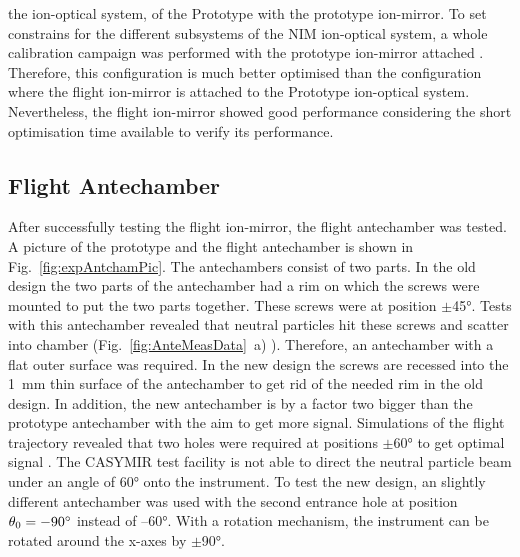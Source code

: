 	the ion-optical system, of the Prototype with the prototype ion-mirror. To set constrains for the different subsystems of the NIM ion-optical system, a whole calibration campaign was performed with the prototype ion-mirror attached \cite{Diss_Meyer}. Therefore, this configuration is much better optimised than the configuration where the flight ion-mirror is attached to the Prototype ion-optical system. Nevertheless, the flight ion-mirror showed good performance considering the short optimisation time available to verify its performance.
	
	
	\subsection{Flight Antechamber} \label{subsec:ExpAnteCham}
	After successfully testing the flight ion-mirror, the flight antechamber was tested. A picture of the prototype and the flight antechamber is shown in Fig.~\ref{fig:expAntchamPic}. The antechambers consist of two parts. In the old design the two parts of the antechamber had a rim on which the screws were mounted to put the two parts together. These screws were at position $\pm$45°. Tests with this antechamber revealed that neutral particles hit these screws and scatter into chamber (Fig.~\ref{fig:AnteMeasData}~a) \cite{Meyer_2017_ante}). Therefore, an antechamber with a flat outer surface was required. In the new design the screws are recessed into the 1~mm thin surface of the antechamber to get rid of the needed rim in the old design. In addition, the new antechamber is by a factor two bigger than the prototype antechamber with the aim to get more signal. Simulations of the flight trajectory revealed that two holes were required at positions $\pm$60° to get optimal signal \cite{SOC_Crema3p2}. The CASYMIR test facility is not able to direct the neutral particle beam under an angle of 60° onto the instrument. To test the new design, an slightly different antechamber was used with the second entrance hole at position $\theta_0 = -90^\circ$ instead of --60°. With a rotation mechanism, the instrument can be rotated around the x-axes by $\pm$90°.\\
